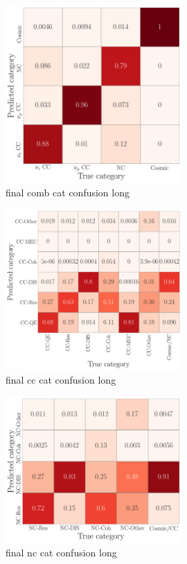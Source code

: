 \begin{figure} %
    \includegraphics[width=0.6\textwidth]{diagrams/7-cvn/chipsnet/final_comb_cat_confusion.pdf}
    \caption[final comb cat confusion short]
    {final comb cat confusion long}
    \label{fig:final_comb_cat_confusion}
\end{figure}

\begin{figure} %
    \includegraphics[width=0.6\textwidth]{diagrams/7-cvn/chipsnet/final_cc_cat_confusion.pdf}
    \caption[final cc cat confusion short]
    {final cc cat confusion long}
    \label{fig:final_cc_cat_confusion}
\end{figure}

\begin{figure} %
    \includegraphics[width=0.6\textwidth]{diagrams/7-cvn/chipsnet/final_nc_cat_confusion.pdf}
    \caption[final nc cat confusion short]
    {final nc cat confusion long}
    \label{fig:final_nc_cat_confusion}
\end{figure}

